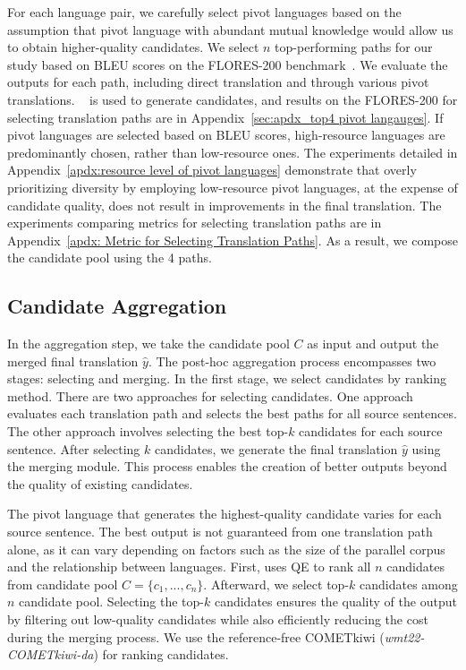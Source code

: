 For each language pair, we carefully select pivot languages based on the assumption that pivot language with abundant mutual knowledge would allow us to obtain higher-quality candidates.
We select $n$ top-performing paths for our study based on BLEU scores on the FLORES-200 benchmark~\cite{nllb}.
We evaluate the outputs for each path, including direct translation and through various pivot translations.
\nllb~\cite{nllb} is used to generate candidates, and results on the FLORES-200 for selecting translation paths are in Appendix~\ref{sec:apdx_top4 pivot langauges}.
If pivot languages are selected based on BLEU scores, high-resource languages are predominantly chosen, rather than low-resource ones.
The experiments detailed in Appendix~\ref{apdx:resource level of pivot languages} demonstrate that overly prioritizing diversity by employing low-resource pivot languages, at the expense of candidate quality, does not result in improvements in the final translation.
The experiments comparing metrics for selecting translation paths are in Appendix~\ref{apdx: Metric for Selecting Translation Paths}.
As a result, we compose the candidate pool using the 4 paths.


\subsection{Candidate Aggregation}
\label{sec:candidate aggregation}


In the aggregation step, we take the candidate pool $C$ as input and output the merged final translation $\hat{y}$.
The post-hoc aggregation process encompasses two stages: selecting and merging.
In the first stage, we select candidates by ranking method.
There are two approaches for selecting candidates.
One approach evaluates each translation path and selects the best paths for all source sentences.
The other approach involves selecting the best top-$\textit{k}$ candidates for each source sentence.
After selecting $\textit{k}$ candidates, we generate the final translation $\hat{y}$ using the merging module.
This process enables the creation of better outputs beyond the quality of existing candidates.


The pivot language that generates the highest-quality candidate varies for each source sentence.
The best output is not guaranteed from one translation path alone, as it can vary depending on factors such as the size of the parallel corpus and the relationship between languages.
First, \ours uses QE to rank all $n$ candidates from candidate pool $C = \{c_1, ..., c_n\}$.
Afterward, we select top-$\textit{k}$ candidates among $n$ candidate pool.
Selecting the top-$\textit{k}$ candidates ensures the quality of the output by filtering out low-quality candidates while also efficiently reducing the cost during the merging process.
We use the reference-free COMETkiwi (\textit{wmt22-COMETkiwi-da}) \cite{rei2022cometkiwi} for ranking candidates.



